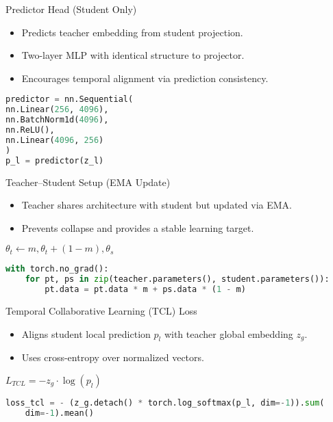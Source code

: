 \documentclass{beamer}
\begin{document}
\begin{frame}[fragile]{Predictor Head (Student Only)}
    \begin{itemize}
        \item Predicts teacher embedding from student projection.
        \item Two-layer MLP with identical structure to projector.
        \item Encourages temporal alignment via prediction consistency.
    \end{itemize}
    \begin{lstlisting}[language=Python, basicstyle=\ttfamily\scriptsize]
predictor = nn.Sequential(
nn.Linear(256, 4096),
nn.BatchNorm1d(4096),
nn.ReLU(),
nn.Linear(4096, 256)
)
p_l = predictor(z_l)
\end{lstlisting}
\end{frame}

\begin{frame}[fragile]{Teacher--Student Setup (EMA Update)}
    \begin{itemize}
        \item Teacher shares architecture with student but updated via EMA.
        \item Prevents collapse and provides a stable learning target.
    \end{itemize}
    \begin{math}
        \theta_t \leftarrow m, \theta_t + (1 - m), \theta_s
    \end{math}
    \begin{lstlisting}[language=Python, basicstyle=\ttfamily\scriptsize]
with torch.no_grad():
    for pt, ps in zip(teacher.parameters(), student.parameters()):
        pt.data = pt.data * m + ps.data * (1 - m)
\end{lstlisting}
\end{frame}

\begin{frame}[fragile]{Temporal Collaborative Learning (TCL) Loss}
    \begin{itemize}
        \item Aligns student local prediction $p_l$ with teacher global embedding $z_g$.
        \item Uses cross-entropy over normalized vectors.
    \end{itemize}
    \begin{math}
        L_{TCL} = - z_g \cdot \log(p_l)
    \end{math}
    \begin{lstlisting}[language=Python, basicstyle=\ttfamily\scriptsize]
loss_tcl = - (z_g.detach() * torch.log_softmax(p_l, dim=-1)).sum(
    dim=-1).mean()
\end{lstlisting}
\end{frame}
\end{document}
